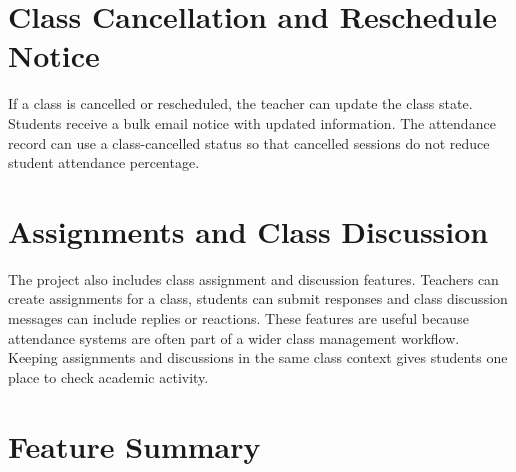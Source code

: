 \section{Class Cancellation and Reschedule Notice}

If a class is cancelled or rescheduled, the teacher can update the class state. Students receive a bulk email notice with updated information. The attendance record can use a class-cancelled status so that cancelled sessions do not reduce student attendance percentage.

\section{Assignments and Class Discussion}

The project also includes class assignment and discussion features. Teachers can create assignments for a class, students can submit responses and class discussion messages can include replies or reactions. These features are useful because attendance systems are often part of a wider class management workflow. Keeping assignments and discussions in the same class context gives students one place to check academic activity.

\section{Feature Summary}


